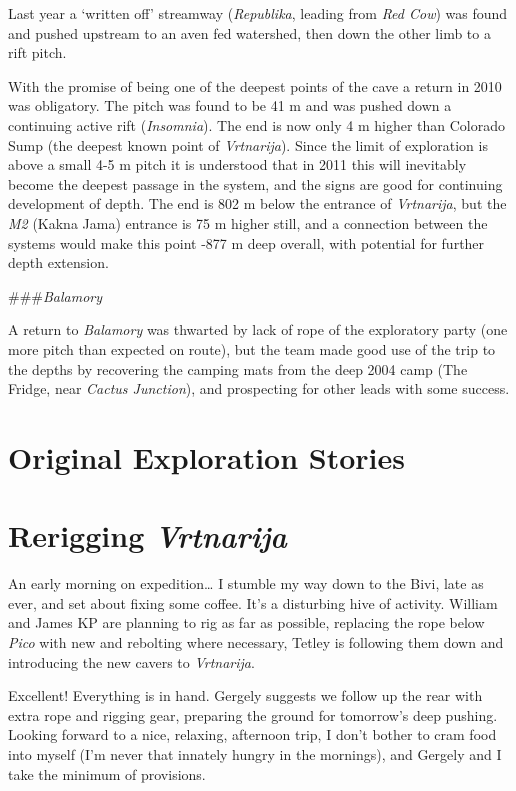Last year a `written off' streamway (\emph{Republika}, leading from
\emph{Red Cow}) was found and pushed upstream to an aven fed watershed,
then down the other limb to a rift pitch.

With the promise of being one of the deepest points of the cave a return
in 2010 was obligatory. The pitch was found to be 41 m and was pushed
down a continuing active rift (\emph{Insomnia}). The end is now only 4 m
higher than Colorado Sump (the deepest known point of \emph{Vrtnarija}).
Since the limit of exploration is above a small 4-5 m pitch it is
understood that in 2011 this will inevitably become the deepest passage
in the system, and the signs are good for continuing development of
depth. The end is 802 m below the entrance of \emph{Vrtnarija}, but the
\emph{M2} (Kakna Jama) entrance is 75 m higher still, and a connection
between the systems would make this point -877 m deep overall, with
potential for further depth extension.

\#\#\#\emph{Balamory}

A return to \emph{Balamory} was thwarted by lack of rope of the
exploratory party (one more pitch than expected on route), but the team
made good use of the trip to the depths by recovering the camping mats
from the deep 2004 camp (The Fridge, near \emph{Cactus Junction}), and
prospecting for other leads with some success.

\hypertarget{original-exploration-stories}{%
\section{Original Exploration
Stories}\label{original-exploration-stories}}

\hypertarget{rerigging-vrtnarija}{%
\section{\texorpdfstring{Rerigging
\emph{Vrtnarija}}{Rerigging Vrtnarija}}\label{rerigging-vrtnarija}}

An early morning on expedition\ldots{} I stumble my way down to the
Bivi, late as ever, and set about fixing some coffee. It's a disturbing
hive of activity. William and James KP are planning to rig as far as
possible, replacing the rope below \emph{Pico} with new and rebolting
where necessary, Tetley is following them down and introducing the new
cavers to \emph{Vrtnarija}.

Excellent! Everything is in hand. Gergely suggests we follow up the rear
with extra rope and rigging gear, preparing the ground for tomorrow's
deep pushing. Looking forward to a nice, relaxing, afternoon trip, I
don't bother to cram food into myself (I'm never that innately hungry in
the mornings), and Gergely and I take the minimum of provisions.

